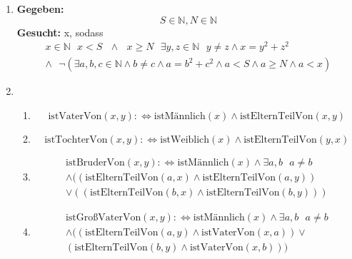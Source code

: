 \documentclass[a4paper]{article}
\begin{document}
\begin{enumerate}
		\item
		\textbf{Gegeben:}
		\begin{equation*}
			S \in \mathbb{N}, N \in \mathbb{N}
		\end{equation*}
		\textbf{Gesucht: } x, sodass
		\begin{equation*}
			\begin{aligned}
				x \in \mathbb{N} \text{ } x < S \text{ } \land \text{ } x \geq N \text{ } \exists y, z \in \mathbb{N} \text{ } y \neq z \land x = y^{2} + z^{2} \\ \land \text{ } \lnot (\exists a, b, c \in \mathbb{N} \land b \neq c \land a = b^{2} + c^{2} \land a < S \land a \geq N \land a < x)
			\end{aligned}
		\end{equation*}
		
		\item
		\begin{enumerate}
			\item
			\begin{equation*}
				\text{istVaterVon}(x, y) :\Leftrightarrow \text{istMännlich}(x) \land \text{istElternTeilVon}(x, y)
			\end{equation*}
			
			\item
			\begin{equation*}
				\text{istTochterVon}(x, y) :\Leftrightarrow \text{istWeiblich}(x) \land \text{istElternTeilVon}(y, x)
			\end{equation*}
			
			\item
			\begin{equation*}
				\begin{aligned}
					\text{istBruderVon}(x, y) :\Leftrightarrow \text{istMännlich}(x) \land \exists a, b \text{ } a \neq b \\ \land ((\text{istElternTeilVon}(a, x) \land \text{istElternTeilVon}(a, y)) \\ \lor ((\text{istElternTeilVon}(b, x) \land \text{istElternTeilVon}(b, y)))
				 \end{aligned}
			\end{equation*}
			
			\item
			\begin{equation*}
				\begin{aligned}
					\text{istGroßVaterVon}(x, y) :\Leftrightarrow \text{istMännlich}(x) \land \exists a, b \text{ } a \neq b \\ \land ((\text{istElternTeilVon}(a, y) \land \text{istVaterVon}(x, a)) \lor \\ (\text{istElternTeilVon}(b, y) \land \text{istVaterVon}(x, b)))
				\end{aligned}
			\end{equation*}
			

\end{enumerate}
\end{enumerate}
\end{document}
